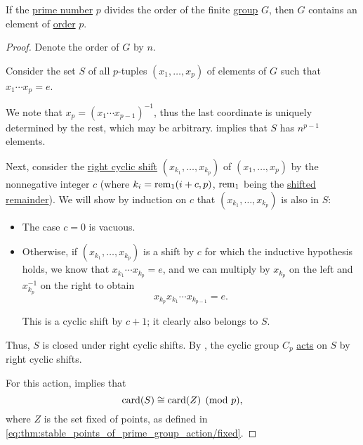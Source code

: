 \begin{theorem}\label{thm:cauchys_subgroup_theorem}
  If the \hyperref[def:prime_number]{prime number} \( p \) divides the order of the finite \hyperref[def:group]{group} \( G \), then \( G \) contains an element of \hyperref[def:group_element_order]{order} \( p \).
\end{theorem}
\begin{proof}
  Denote the order of \( G \) by \( n \).

  Consider the set \( S \) of all \( p \)-tuples \( (x_1, \ldots, x_p) \) of elements of \( G \) such that \( x_1 \cdots x_p = e \).

  We note that \( x_p = (x_1 \cdots x_{p-1})^{-1} \), thus the last coordinate is uniquely determined by the rest, which may be arbitrary.  implies that \( S \) has \( n^{p-1} \) elements.

  Next, consider the \hyperref[def:cyclic_shift]{right cyclic shift} \( (x_{k_1}, \ldots, x_{k_p}) \) of \( (x_1, \ldots, x_p) \) by the nonnegative integer \( c \) (where \( k_i = \operatorname{rem}_1(i + c, p) \), \( \operatorname{rem}_1 \) being the \hyperref[def:shifted_remainder]{shifted remainder}). We will show by induction on \( c \) that \( (x_{k_1}, \ldots, x_{k_p}) \) is also in \( S \):
  \begin{itemize}
    \item The case \( c = 0 \) is vacuous.
    \item Otherwise, if \( (x_{k_1}, \ldots, x_{k_p}) \) is a shift by \( c \) for which the inductive hypothesis holds, we know that \( x_{k_1} \cdots x_{k_p} = e \), and we can multiply by \( x_{k_p} \) on the left and \( x_{k_p}^{-1} \) on the right to obtain
    \begin{equation*}
      x_{k_p} x_{k_1} \cdots x_{k_{p-1}} = e.
    \end{equation*}

    This is a cyclic shift by \( c + 1 \); it clearly also belongs to \( S \).
  \end{itemize}

  Thus, \( S \) is closed under right cyclic shifts. By , the cyclic group \( C_p \) \hyperref[def:group_action]{acts} on \( S \) by right cyclic shifts.

  For this action,  implies that
  \begin{equation*}
    \operatorname{card}(S) \cong \operatorname{card}(Z) \pmod p,
  \end{equation*}
  where \( Z \) is the set fixed of points, as defined in \eqref{eq:thm:stable_points_of_prime_group_action/fixed}.


\end{proof}
